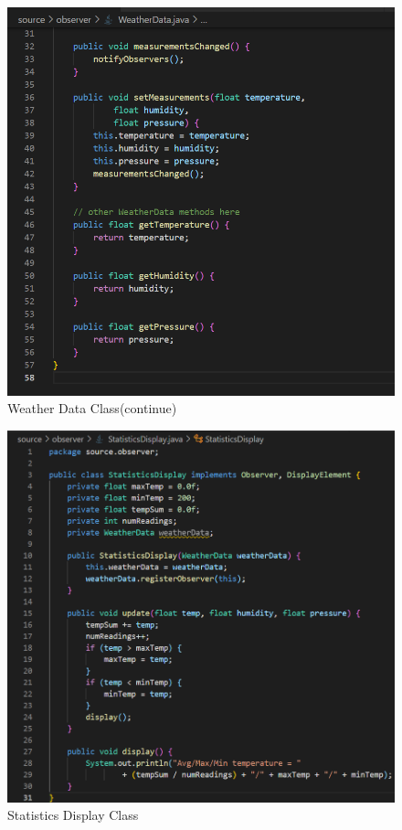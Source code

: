 \begin{figure}[!htb]
    \centering
    \includegraphics[width=\textwidth]{fig/Observer/weather_data_class_continue.png}
    \caption{Weather Data Class(continue)}
    \label{fig:weather_data_class_continue}
\end{figure}
\newpage
\begin{figure}[!htb]
    \centering
    \includegraphics[width=\textwidth]{fig/Observer/statistics_display_class.png}
    \caption{Statistics Display Class}
    \label{fig:statistics_display_class}
\end{figure}
